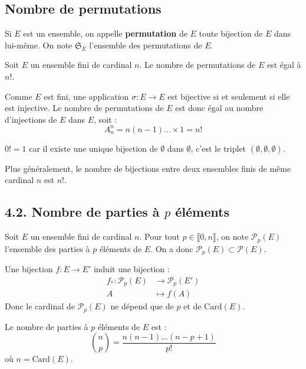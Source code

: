 \documentclass[a4paper,11pt]{article}
\newcommand{\mot}[1]{\textcolor{bordeaux}{\textbf{#1}}}
\begin{document}
\newpage
\subsection*{Nombre de permutations}

\begin{definition}
  Si $E$ est un ensemble, on appelle \mot{permutation} de $E$ toute bijection de $E$ dans lui-même.
  On note $\mathfrak{S}_E$ l'ensemble des permutations de $E$.
\end{definition}

\begin{proposition}
  Soit $E$ un ensemble fini de cardinal $n$. Le nombre de permutations de $E$ est égal à $n!$.
\end{proposition}

\begin{demonstration}
  Comme $E$ est fini, une application $\sigma : E \to E$ est bijective si et seulement si elle est injective.
  Le nombre de permutations de $E$ est donc égal au nombre d'injections de $E$ dans $E$, soit :
  $$ A_n^n = n(n-1)\dots \times 1 = n! $$
\end{demonstration}

\begin{remarque}
  $0! = 1$ car il existe une unique bijection de $\emptyset$ dans $\emptyset$, c'est le triplet $(\emptyset, \emptyset, \emptyset)$.
  
  Plus généralement, le nombre de bijections entre deux ensembles finis de même cardinal $n$ est $n!$.
\end{remarque}


\newpage
\subsection{4.2. Nombre de parties à $p$ éléments}

Soit $E$ un ensemble fini de cardinal $n$. Pour tout $p \in \llbracket 0, n \rrbracket$, on note $\mathcal{P}_p(E)$ l'ensemble des parties à $p$ éléments de $E$.
On a donc $\mathcal{P}_p(E) \subset \mathcal{P}(E)$.

Une bijection $f : E \to E'$ induit une bijection :
\begin{align*}
  f_* : \mathcal{P}_p(E) &\longrightarrow \mathcal{P}_p(E') \\
  A &\longmapsto f(A)
\end{align*}
Donc le cardinal de $\mathcal{P}_p(E)$ ne dépend que de $p$ et de $\text{Card}(E)$.

\begin{theoreme}
  Le nombre de parties à $p$ éléments de $E$ est :
  $$ \binom{n}{p} = \frac{n(n-1)\dots(n-p+1)}{p!} $$
  où $n = \text{Card}(E)$.
\end{theoreme}
\end{document}

